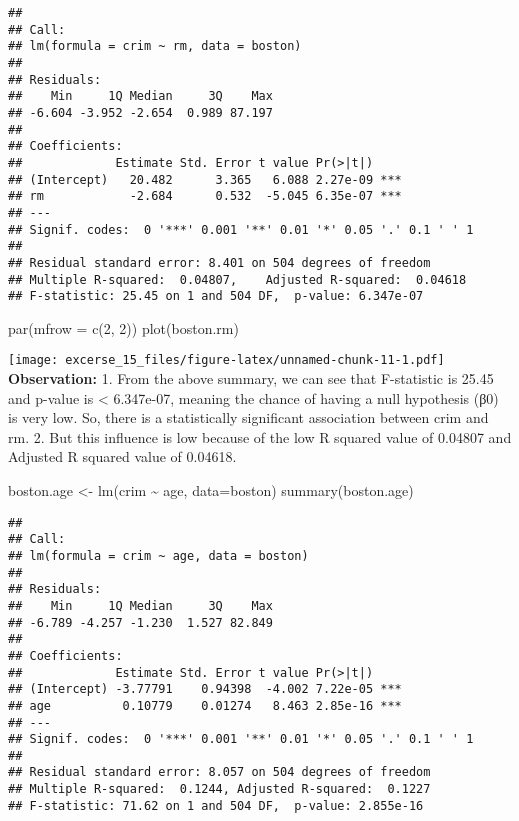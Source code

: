 \documentclass[
]{article}
\newenvironment{Shaded}{\begin{snugshade}}{\end{snugshade}}
\newcommand{\AttributeTok}[1]{\textcolor[rgb]{0.77,0.63,0.00}{#1}}
\newcommand{\DecValTok}[1]{\textcolor[rgb]{0.00,0.00,0.81}{#1}}
\newcommand{\FunctionTok}[1]{\textcolor[rgb]{0.00,0.00,0.00}{#1}}
\newcommand{\NormalTok}[1]{#1}
\newcommand{\OtherTok}[1]{\textcolor[rgb]{0.56,0.35,0.01}{#1}}
\newcommand{\SpecialCharTok}[1]{\textcolor[rgb]{0.00,0.00,0.00}{#1}}
\begin{document}
\begin{verbatim}
## 
## Call:
## lm(formula = crim ~ rm, data = boston)
## 
## Residuals:
##    Min     1Q Median     3Q    Max 
## -6.604 -3.952 -2.654  0.989 87.197 
## 
## Coefficients:
##             Estimate Std. Error t value Pr(>|t|)    
## (Intercept)   20.482      3.365   6.088 2.27e-09 ***
## rm            -2.684      0.532  -5.045 6.35e-07 ***
## ---
## Signif. codes:  0 '***' 0.001 '**' 0.01 '*' 0.05 '.' 0.1 ' ' 1
## 
## Residual standard error: 8.401 on 504 degrees of freedom
## Multiple R-squared:  0.04807,    Adjusted R-squared:  0.04618 
## F-statistic: 25.45 on 1 and 504 DF,  p-value: 6.347e-07
\end{verbatim}

\begin{Shaded}
\begin{Highlighting}[]
\FunctionTok{par}\NormalTok{(}\AttributeTok{mfrow =} \FunctionTok{c}\NormalTok{(}\DecValTok{2}\NormalTok{, }\DecValTok{2}\NormalTok{))}
\FunctionTok{plot}\NormalTok{(boston.rm)}
\end{Highlighting}
\end{Shaded}

\texttt{[image: excerse\_15\_files/figure-latex/unnamed-chunk-11-1.pdf]}
\textbf{Observation:} 1. From the above summary, we can see that
F-statistic is 25.45 and p-value is \textless{} 6.347e-07, meaning the
chance of having a null hypothesis (β0) is very low. So, there is a
statistically significant association between crim and rm. 2. But this
influence is low because of the low R squared value of 0.04807 and
Adjusted R squared value of 0.04618.

\begin{Shaded}
\begin{Highlighting}[]
\NormalTok{boston.age }\OtherTok{\textless{}{-}} \FunctionTok{lm}\NormalTok{(crim }\SpecialCharTok{\textasciitilde{}}\NormalTok{ age, }\AttributeTok{data=}\NormalTok{boston)}
\FunctionTok{summary}\NormalTok{(boston.age)}
\end{Highlighting}
\end{Shaded}

\begin{verbatim}
## 
## Call:
## lm(formula = crim ~ age, data = boston)
## 
## Residuals:
##    Min     1Q Median     3Q    Max 
## -6.789 -4.257 -1.230  1.527 82.849 
## 
## Coefficients:
##             Estimate Std. Error t value Pr(>|t|)    
## (Intercept) -3.77791    0.94398  -4.002 7.22e-05 ***
## age          0.10779    0.01274   8.463 2.85e-16 ***
## ---
## Signif. codes:  0 '***' 0.001 '**' 0.01 '*' 0.05 '.' 0.1 ' ' 1
## 
## Residual standard error: 8.057 on 504 degrees of freedom
## Multiple R-squared:  0.1244, Adjusted R-squared:  0.1227 
## F-statistic: 71.62 on 1 and 504 DF,  p-value: 2.855e-16
\end{verbatim}
\end{document}
